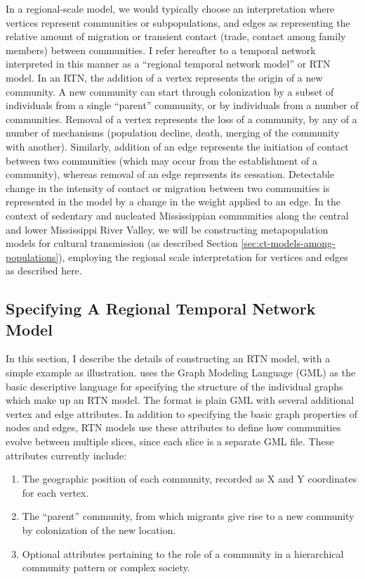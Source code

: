 In a regional-scale model, we would typically choose an interpretation where vertices represent communities or subpopulations, and edges as representing the relative amount of migration or transient contact (trade, contact among family members) between communities.  I refer hereafter to a temporal network interpreted in this manner as a ``regional temporal network model'' or RTN model.  In an RTN, the addition of a vertex represents the origin of a new community.  A new community can start through colonization by a subset of individuals from a single ``parent'' community, or by individuals from a number of communities.  Removal of a vertex represents the loss of a community, by any of a number of mechanisms (population decline, death, merging of the community with another).  Similarly, addition of an edge represents the initiation of contact between two communities (which may occur from the establishment of a community), whereas removal of an edge represents its cessation.  Detectable change in the intensity of contact or migration between two communities is represented in the model by a change in the weight applied to an edge.  In the context of sedentary and nucleated Mississippian communities along the central and lower Mississippi River Valley, we will be constructing metapopulation models for cultural transmission (as described Section \ref{sec:ct-models-among-populations}), employing the regional scale interpretation for vertices and edges as described here.

\subsection{Specifying A Regional Temporal Network Model}
\label{sec:specifying-rtn}



In this section, I describe the details of constructing an RTN model, with a simple example as illustration.  \seriationct uses the Graph Modeling Language (GML) as the basic descriptive language for specifying the structure of the individual graphs which make up an RTN model.  The format is plain GML with several additional vertex and edge attributes.  In addition to specifying the basic graph properties of nodes and edges, RTN models use these attributes to define how communities evolve between multiple slices, since each slice is a separate GML file. These attributes currently include:

\begin{enumerate}[label=\emph{\arabic*})]
 	\item The geographic position of each community, recorded as X and Y coordinates for each vertex.
 	\item The ``parent'' community, from which migrants give rise to a new community by colonization of the new location.
  \item Optional attributes pertaining to the role of a community in a hierarchical community pattern or complex society.
 \end{enumerate} 

